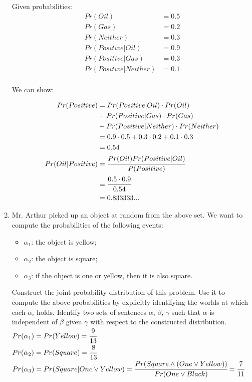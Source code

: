 \documentclass[12pt]{article}
\begin{document}
\begin{enumerate}
	Given probabilities: \\

	\begin{align*}
	Pr(Oil) &= 0.5 \\
	Pr(Gas) &= 0.2 \\
	Pr(Neither) &= 0.3 \\
	Pr(Positive | Oil) &= 0.9 \\
	Pr(Positive | Gas) &= 0.3 \\
	Pr(Positive | Neither) &= 0.1 \\
	\end{align*}

	We can show: 

	\begin{align*}
	Pr(Positive) &= Pr(Positive | Oil) \cdot Pr(Oil) \\
	&+ Pr(Positive | Gas) \cdot Pr(Gas) \\
	&+ Pr(Positive | Neither) \cdot Pr(Neither) \\
	&= 0.9 \cdot 0.5 + 0.3 \cdot 0.2 + 0.1 \cdot 0.3 \\
	&= 0.54\\
	Pr(Oil | Positive) &= \cfrac{Pr(Oil) Pr(Positive | Oil)}{P(Positive)} \\
	&= \cfrac{0.5 \cdot 0.9}{0.54}\\
	&= 0.833333...
	\end{align*}

	\item Mr. Arthur picked up an object at random from the above set. We want to compute the probabilities of the following events:

	\begin{itemize}
		\item $\alpha_1$: the object is yellow;
		\item $\alpha_2$: the object is square;
		\item $\alpha_3$: if the object is one or yellow, then it is also square.
	\end{itemize}

	Construct the joint probability distribution of this problem. Use it to compute the above probabilities by explicitly identifying the worlds at which each $\alpha_i$ holds. Identify two sets of sentences $\alpha$, $\beta$, $\gamma$ such that $\alpha$ is independent of $\beta$ given $\gamma$ with respect to the constructed distribution. \\

	$Pr(\alpha_1) = Pr(Yellow) = \cfrac{9}{13}$ \\
	$Pr(\alpha_2) = Pr(Square) = \cfrac{8}{13}$ \\
	$Pr(\alpha_3) = Pr(Square | One \lor Yellow) = \cfrac{Pr(Square \land (One \lor Yellow))}{Pr(One \lor Black)} = \cfrac{7}{11}$\\


\end{enumerate}
\end{document}
